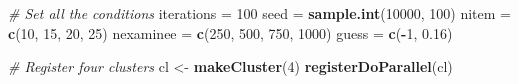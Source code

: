 \documentclass[
]{book}
\newenvironment{Shaded}{\begin{snugshade}}{\end{snugshade}}
\newcommand{\CommentTok}[1]{\textcolor[rgb]{0.56,0.35,0.01}{\textit{#1}}}
\newcommand{\DecValTok}[1]{\textcolor[rgb]{0.00,0.00,0.81}{#1}}
\newcommand{\FloatTok}[1]{\textcolor[rgb]{0.00,0.00,0.81}{#1}}
\newcommand{\KeywordTok}[1]{\textcolor[rgb]{0.13,0.29,0.53}{\textbf{#1}}}
\newcommand{\NormalTok}[1]{#1}
\newcommand{\OperatorTok}[1]{\textcolor[rgb]{0.81,0.36,0.00}{\textbf{#1}}}
\newcommand{\StringTok}[1]{\textcolor[rgb]{0.31,0.60,0.02}{#1}}
\begin{document}
\begin{Shaded}
\begin{Highlighting}[]
\CommentTok{# Set all the conditions}
\NormalTok{iterations =}\StringTok{ }\DecValTok{100}
\NormalTok{seed =}\StringTok{ }\KeywordTok{sample.int}\NormalTok{(}\DecValTok{10000}\NormalTok{, }\DecValTok{100}\NormalTok{)}
\NormalTok{nitem =}\StringTok{ }\KeywordTok{c}\NormalTok{(}\DecValTok{10}\NormalTok{, }\DecValTok{15}\NormalTok{, }\DecValTok{20}\NormalTok{, }\DecValTok{25}\NormalTok{)}
\NormalTok{nexaminee =}\StringTok{ }\KeywordTok{c}\NormalTok{(}\DecValTok{250}\NormalTok{, }\DecValTok{500}\NormalTok{, }\DecValTok{750}\NormalTok{, }\DecValTok{1000}\NormalTok{)}
\NormalTok{guess =}\StringTok{ }\KeywordTok{c}\NormalTok{(}\OperatorTok{-}\DecValTok{1}\NormalTok{, }\FloatTok{0.16}\NormalTok{)}

\CommentTok{# Register four clusters}
\NormalTok{cl <-}\StringTok{ }\KeywordTok{makeCluster}\NormalTok{(}\DecValTok{4}\NormalTok{) }
\KeywordTok{registerDoParallel}\NormalTok{(cl)}


\end{Highlighting}
\end{Shaded}
\end{document}

